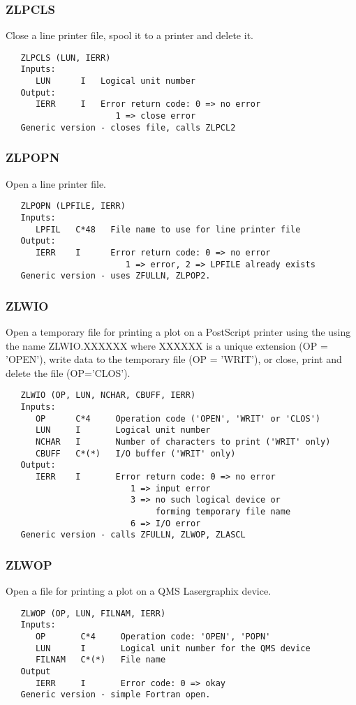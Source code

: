 \subsubsection{ZLPCLS}
Close a line printer file, spool it to a printer and delete it.
\begin{verbatim}
   ZLPCLS (LUN, IERR)
   Inputs:
      LUN      I   Logical unit number
   Output:
      IERR     I   Error return code: 0 => no error
                      1 => close error
   Generic version - closes file, calls ZLPCL2
\end{verbatim}

\subsubsection{ZLPOPN}
Open a line printer file.
\begin{verbatim}
   ZLPOPN (LPFILE, IERR)
   Inputs:
      LPFIL   C*48   File name to use for line printer file
   Output:
      IERR    I      Error return code: 0 => no error
                        1 => error, 2 => LPFILE already exists
   Generic version - uses ZFULLN, ZLPOP2.
\end{verbatim}

\subsubsection{ZLWIO}
Open a temporary file for printing a plot on a PostScript printer
using the using the name ZLWIO.XXXXXX where XXXXXX is a unique
extension (OP = 'OPEN'),  write data to the temporary file (OP =
'WRIT'), or close, print and delete the file (OP='CLOS').
\begin{verbatim}
   ZLWIO (OP, LUN, NCHAR, CBUFF, IERR)
   Inputs:
      OP      C*4     Operation code ('OPEN', 'WRIT' or 'CLOS')
      LUN     I       Logical unit number
      NCHAR   I       Number of characters to print ('WRIT' only)
      CBUFF   C*(*)   I/O buffer ('WRIT' only)
   Output:
      IERR    I       Error return code: 0 => no error
                         1 => input error
                         3 => no such logical device or
                              forming temporary file name
                         6 => I/O error
   Generic version - calls ZFULLN, ZLWOP, ZLASCL
\end{verbatim}

\subsubsection{ZLWOP}
Open a file for printing a plot on a QMS Lasergraphix device.
\begin{verbatim}
   ZLWOP (OP, LUN, FILNAM, IERR)
   Inputs:
      OP       C*4     Operation code: 'OPEN', 'POPN'
      LUN      I       Logical unit number for the QMS device
      FILNAM   C*(*)   File name
   Output
      IERR     I       Error code: 0 => okay
   Generic version - simple Fortran open.
\end{verbatim}

